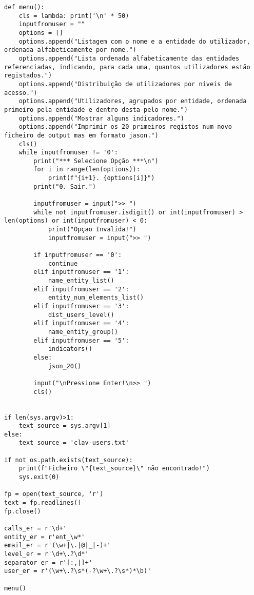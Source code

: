 \documentclass[11pt,a4paper]{report}%
\begin{document}
\begin{scriptsize}
\begin{verbatim}
def menu():
    cls = lambda: print('\n' * 50)
    inputfromuser = ""
    options = []
    options.append("Listagem com o nome e a entidade do utilizador, ordenada alfabeticamente por nome.")
    options.append("Lista ordenada alfabeticamente das entidades referenciadas, indicando, para cada uma, quantos utilizadores estão registados.")
    options.append("Distribuição de utilizadores por níveis de acesso.")
    options.append("Utilizadores, agrupados por entidade, ordenada primeiro pela entidade e dentro desta pelo nome.")
    options.append("Mostrar alguns indicadores.")
    options.append("Imprimir os 20 primeiros registos num novo ficheiro de output mas em formato jason.")
    cls()
    while inputfromuser != '0':
        print("*** Selecione Opção ***\n")
        for i in range(len(options)):
            print(f"{i+1}. {options[i]}")
        print("0. Sair.")

        inputfromuser = input(">> ")
        while not inputfromuser.isdigit() or int(inputfromuser) > len(options) or int(inputfromuser) < 0:
            print("Opçao Invalida!")
            inputfromuser = input(">> ")

        if inputfromuser == '0':
            continue
        elif inputfromuser == '1':
            name_entity_list()
        elif inputfromuser == '2':
            entity_num_elements_list()
        elif inputfromuser == '3':
            dist_users_level()
        elif inputfromuser == '4':
            name_entity_group()
        elif inputfromuser == '5':
            indicators()
        else:
            json_20()

        input("\nPressione Enter!\n>> ")
        cls()


if len(sys.argv)>1:
    text_source = sys.argv[1]
else:
    text_source = 'clav-users.txt'

if not os.path.exists(text_source):
    print(f"Ficheiro \"{text_source}\" não encontrado!")
    sys.exit(0)

fp = open(text_source, 'r')
text = fp.readlines()
fp.close()

calls_er = r'\d+'
entity_er = r'ent_\w*'
email_er = r'(\w+|\.|@|_|-)+'
level_er = r'\d+\.?\d*'
separator_er = r'[:,|]+'
user_er = r'(\w+\.?\s*(-?\w+\.?\s*)*\b)'

menu()
\end{verbatim}
\end{scriptsize}







\end{document}
